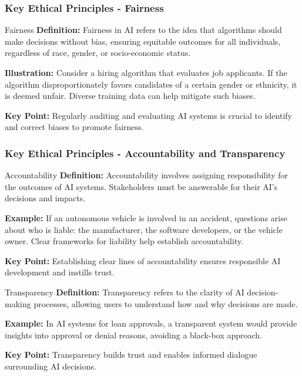 \documentclass[aspectratio=169]{beamer}
\begin{document}
\begin{frame}[fragile]
  \frametitle{Key Ethical Principles - Fairness}
  \begin{block}{Fairness}
    \textbf{Definition:} Fairness in AI refers to the idea that algorithms should make decisions without bias, ensuring equitable outcomes for all individuals, regardless of race, gender, or socio-economic status.
  \end{block}
  
  \textbf{Illustration:} Consider a hiring algorithm that evaluates job applicants. If the algorithm disproportionately favors candidates of a certain gender or ethnicity, it is deemed unfair. Diverse training data can help mitigate such biases.

  \textbf{Key Point:} Regularly auditing and evaluating AI systems is crucial to identify and correct biases to promote fairness.
\end{frame}

\begin{frame}[fragile]
  \frametitle{Key Ethical Principles - Accountability and Transparency}
  \begin{block}{Accountability}
    \textbf{Definition:} Accountability involves assigning responsibility for the outcomes of AI systems. Stakeholders must be answerable for their AI's decisions and impacts.
  \end{block}
  
  \textbf{Example:} If an autonomous vehicle is involved in an accident, questions arise about who is liable: the manufacturer, the software developers, or the vehicle owner. Clear frameworks for liability help establish accountability.

  \textbf{Key Point:} Establishing clear lines of accountability ensures responsible AI development and instills trust.

  \begin{block}{Transparency}
    \textbf{Definition:} Transparency refers to the clarity of AI decision-making processes, allowing users to understand how and why decisions are made.
  \end{block}

  \textbf{Example:} In AI systems for loan approvals, a transparent system would provide insights into approval or denial reasons, avoiding a black-box approach.

  \textbf{Key Point:} Transparency builds trust and enables informed dialogue surrounding AI decisions.
\end{frame}
\end{document}
